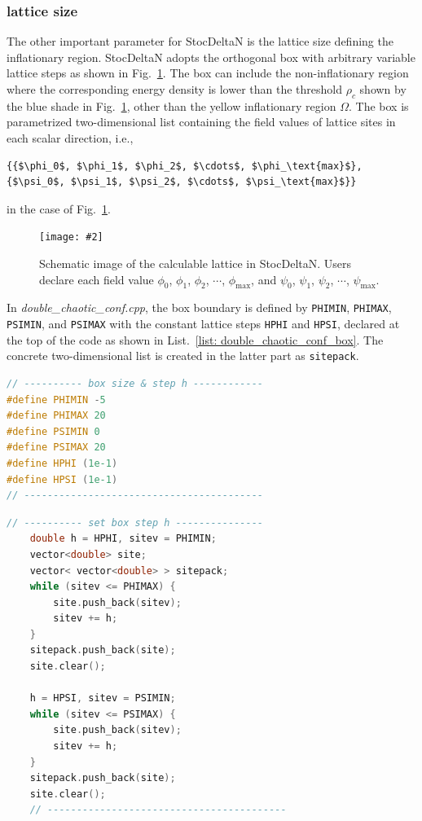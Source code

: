 \documentclass[aps, prd
, preprint
, nofootinbib 
, notitlepage
, superscriptaddress
, longbibliography
]{revtex4-1}
\newcommand{\bfe}[4]{
\begin{figure} 
	\centering
	\texttt{[image: \#2]}
	\caption{#3}
	\label{#4}
\end{figure}}
\begin{document}
\subsubsection{lattice size}

The other important parameter for StocDeltaN is the lattice size defining the inflationary region.
StocDeltaN adopts the orthogonal box with arbitrary variable lattice steps as shown in Fig.~\ref{fig: box}.
The box can include the non-inflationary region where the corresponding energy density is lower than the threshold $\rho_c$
shown by the blue shade in Fig.~\ref{fig: box}, other than the yellow inflationary region $\Omega$.
The box is parametrized two-dimensional list containing the field values of lattice sites in each scalar direction, i.e.,
\begin{lstlisting}[numbers = none, mathescape]
{{$\phi_0$, $\phi_1$, $\phi_2$, $\cdots$, $\phi_\text{max}$}, {$\psi_0$, $\psi_1$, $\psi_2$, $\cdots$, $\psi_\text{max}$}}
\end{lstlisting}
in the case of Fig.~\ref{fig: box}.

\bfe{width=0.9\hsize}{figs/box.pdf}{Schematic image of the calculable lattice in StocDeltaN. Users declare each field value 
$\phi_0$, $\phi_1$, $\phi_2$, $\cdots$, $\phi_\text{max}$, and $\psi_0$, $\psi_1$, $\psi_2$, $\cdots$, $\psi_\text{max}$.}{fig: box}

In \textit{double\_chaotic\_conf.cpp}, the box boundary is defined by \texttt{PHIMIN}, \texttt{PHIMAX}, \texttt{PSIMIN}, and \texttt{PSIMAX}
with the constant lattice steps \texttt{HPHI} and \texttt{HPSI}, declared at the top of the code as shown in List.~\ref{list: double_chaotic_conf_box}.
The concrete two-dimensional list is created in the latter part as \texttt{sitepack}.

\begin{lstlisting}[language = C++, caption={\textit{sample/double\_chaotic\_conf.cpp}}, label=list: double_chaotic_conf_box, firstnumber = 6]
// ---------- box size & step h ------------
#define PHIMIN -5
#define PHIMAX 20
#define PSIMIN 0
#define PSIMAX 20
#define HPHI (1e-1)
#define HPSI (1e-1)
// -----------------------------------------
\end{lstlisting}
\begin{lstlisting}[language = C++, firstnumber = 52]
	// ---------- set box step h ---------------
	double h = HPHI, sitev = PHIMIN;
	vector<double> site;
	vector< vector<double> > sitepack;
	while (sitev <= PHIMAX) {
		site.push_back(sitev);
		sitev += h;
	}
	sitepack.push_back(site);
	site.clear();

	h = HPSI, sitev = PSIMIN;
	while (sitev <= PSIMAX) {
		site.push_back(sitev);
		sitev += h;
	}
	sitepack.push_back(site);
	site.clear();
	// -----------------------------------------
\end{lstlisting}
\end{document}
